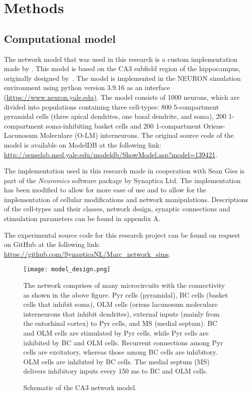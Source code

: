 \chapter{Methods}

\section{Computational model}
The network model that was used in this research is a custom implementation
made by \textcite{sanjayImpairedDendriticInhibition2015}. This model is based
on the CA3 subfield region of the hippocampus, originally designed by~\textcite{neymotinKetamineDisruptsTheta2011}.
The model is implemented in the NEURON
simulation environment using python version 3.9.16 as an interface
\href{https://www.neuron.yale.edu}{(\url{https://www.neuron.yale.edu})}. The
model consists of 1000 neurons, which are divided into populations containing
three cell-types: 800 5-compartment pyramidal cells (three apical dendrites,
one basal dendrite, and soma), 200 1-compartment soma-inhibiting basket cells
and 200 1-compartment Oriens-Lacunosum Moleculare (O-LM) interneurons. The
original source code of the model is available on ModelDB at the following
link:
\href{http://senselab.med.yale.edu/modeldb/ShowModel.asp?model=139421}{\url{http://senselab.med.yale.edu/modeldb/ShowModel.asp?model=139421}}.

The implementation used in this research made in cooperation with Sean Gies is
part of the \textit{Neuromics} software package by Synaptica Ltd. The
implementation has been modified to allow for more ease of use and to allow for
the implementation of cellular modifications and network manipulations.
Descriptions of the cell-types and their classes, network design, synaptic
connections and stimulation parameters can be found in appendix A.

The experimental source code for this research project can be found on request
on GitHub at the following link:
\href{https://github.com/SynapticaNL/Marc_network_sims}{\url{https://github.com/SynapticaNL/Marc_network_sims}}.

\begin{figure}[htbp]
    \centering
    \texttt{[image: model\_design.png]}
    \caption[Schematic of the CA3 network model]{Schematic of the CA3 network model.}\label{fig:model_design}
    \begin{minipage}{0.9\textwidth}
        The network comprises of many microcircuits with the connectivity as shown in the above figure. Pyr cells (pyramidal), BC cells (basket cells that inhibit soma),
        OLM cells (oriens lacunosum moleculare interneurons that inhibit dendrites), external inputs (mainly from the entorhinal cortex) to Pyr cells, and MS (medial septum).
        BC and OLM cells are stimulated by Pyr cells, while Pyr cells are inhibited by BC and OLM cells.
        Recurrent connections among Pyr cells are excitatory, whereas those among BC cells are inhibitory.
        OLM cells are inhibited by BC cells. The medial septum (MS) delivers inhibitory inputs every 150 ms to BC and OLM cells.
    \end{minipage}
\end{figure}\pagebreak

